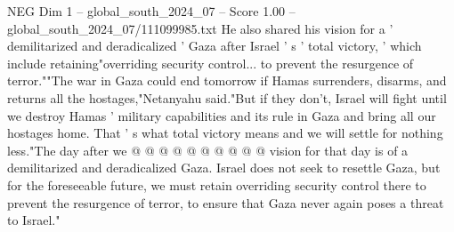 \begin{textsample}{NEG Dim 1 – global\_south\_2024\_07 – Score 1.00 – global\_south\_2024\_07/111099985.txt}
He also shared his vision for a ' demilitarized and deradicalized ' Gaza after Israel ' s ' total victory, ' which include retaining"overriding security control... to prevent the resurgence of terror.""The war in Gaza could end tomorrow if Hamas surrenders, disarms, and returns all the hostages,"Netanyahu said."But if they don't, Israel will fight until we destroy Hamas ' military capabilities and its rule in Gaza and bring all our hostages home.
That ' s what total victory means and we will settle for nothing less."The day after we @ @ @ @ @ @ @ @ @ @ vision for that day is of a demilitarized and deradicalized Gaza.
Israel does not seek to resettle Gaza, but for the foreseeable future, we must retain overriding security control there to prevent the resurgence of terror, to ensure that Gaza never again poses a threat to Israel."

\end{textsample}
